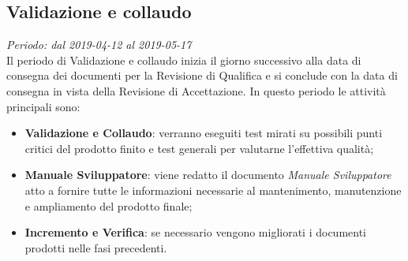 \subsection{Validazione e collaudo}
\textit{Periodo: dal 2019-04-12 al 2019-05-17 } \\
Il periodo di Validazione e collaudo inizia il giorno successivo alla data di consegna dei documenti per la 
Revisione di Qualifica e si conclude con la data di consegna in vista della Revisione di Accettazione. In questo periodo le attività principali sono:
\begin{itemize}
	\item \textbf{Validazione e Collaudo}: verranno eseguiti test mirati su possibili punti critici del prodotto finito e test generali per valutarne l'effettiva qualità;
	\item \textbf{Manuale Sviluppatore}: viene redatto il documento \textit{Manuale Sviluppatore} atto a fornire tutte le informazioni necessarie al mantenimento, manutenzione e ampliamento del prodotto finale;
	\item \textbf{Incremento e Verifica}: se necessario vengono migliorati i 
	documenti prodotti nelle fasi precedenti.
\end{itemize}
